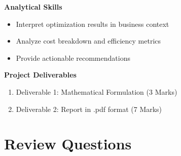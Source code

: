 \documentclass[
  letterpaper,
  DIV=11,
  numbers=noendperiod]{scrreprt}
\providecommand{\tightlist}{%
  \setlength{\itemsep}{0pt}\setlength{\parskip}{0pt}}
\begin{document}
\textbf{Analytical Skills}

\begin{itemize}
\tightlist
\item
  Interpret optimization results in business context
\item
  Analyze cost breakdown and efficiency metrics
\item
  Provide actionable recommendations
\end{itemize}

\textbf{Project Deliverables}

\begin{enumerate}
\def\labelenumi{\arabic{enumi}.}
\tightlist
\item
  Deliverable 1: Mathematical Formulation (3 Marks)
\item
  Deliverable 2: Report in .pdf format (7 Marks)
\end{enumerate}

\section{Review Questions}\label{review-questions}
\end{document}
